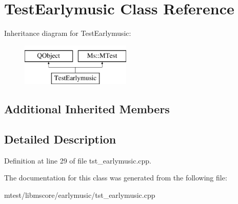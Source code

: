 \hypertarget{class_test_earlymusic}{}\section{Test\+Earlymusic Class Reference}
\label{class_test_earlymusic}
Inheritance diagram for Test\+Earlymusic\+:\begin{figure}[H]
\begin{center}
\leavevmode
\includegraphics[height=2.000000cm]{class_test_earlymusic}
\end{center}
\end{figure}
\subsection*{Additional Inherited Members}


\subsection{Detailed Description}


Definition at line 29 of file tst\+\_\+earlymusic.\+cpp.



The documentation for this class was generated from the following file\+:\begin{DoxyCompactItemize}
\item 
mtest/libmscore/earlymusic/tst\+\_\+earlymusic.\+cpp\end{DoxyCompactItemize}
